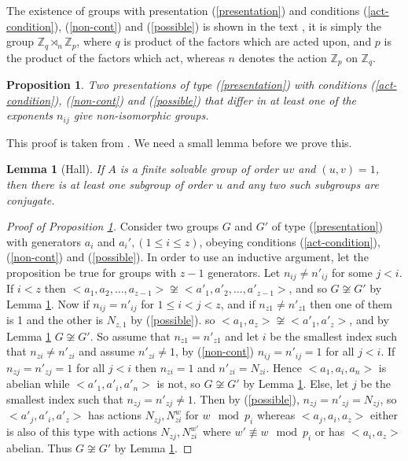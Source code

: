 \documentclass[a4paper, 10pt]{book}
\newtheorem{Lem}[theorem]{Lemma}
\newtheorem{Prop}[theorem]{Proposition}
\theoremstyle{definition}
\numberwithin{equation}{chapter}
\newcommand\ZZ{\mathbb Z}
\newcommand\semidir\rtimes
\begin{document}
The existence of groups with presentation (\ref{presentation}) and conditions (\ref{act-condition}), (\ref{non-cont}) and (\ref{possible}) is shown in the text \cite[Section 9.2.2]{MR896269}, it is simply the group $\ZZ_q\semidir_n \ZZ_p$, where $q$ is product of the factors which are acted upon, and $p$ is the product of the factors which act, whereas $n$ denotes the action $\ZZ_p$ on $\ZZ_q$.  \begin{Prop}\label{uniqueness}
Two presentations of type (\ref{presentation})  with conditions (\ref{act-condition}), (\ref{non-cont}) and (\ref{possible}) that differ in at least one of the exponents $n_{ij}$ give non-isomorphic groups.
\end{Prop}
This proof is taken from \cite{MR506898}. We need a small lemma before we prove this.
\begin{Lem}[Hall]\label{hall}
If $A$ is a finite solvable group of order $uv$ and $(u,v) = 1$, then there is at least one subgroup of order $u$ and any two such subgroups are conjugate.
\end{Lem}
\begin{proof}[Proof of Proposition \ref{uniqueness}]
Consider two groups $G$ and $G'$ of type (\ref{presentation}) with generators $a_i$ and $a_i', (1\leq i \leq z)$, obeying conditions (\ref{act-condition}), (\ref{non-cont}) and (\ref{possible}). 
In order to use an inductive argument, let the proposition be true for groups with $z-1$ generators. Let $n_{ij}\neq n'_{ij}$ for some $j< i$. 
If $i< z$ then $<a_1,a_2,\dots, a_{z-1}> \not\cong <a'_1,a'_2,\dots, a'_{z-1}>$, and so $G\not\cong G'$ by Lemma \ref{hall}. Now if $n_{ij} = n'_{ij}$ for $1\leq i<j<z$, and if $n_{z1}\neq n'_{z1}$ then one of them is 1 and the other is $N_{z,1}$ by (\ref{possible}). so $<a_1, a_z> \not \cong <a'_1, a'_z>$, and by Lemma \ref{hall} $G\not\cong G'$. So assume that $n_{z1} = n'_{z1}$ and let $i$ be the smallest index such that $n_{z i}\neq n'_{zi}$ and assume $n'_{z i}\neq 1$, by (\ref{non-cont}) $n_{ij} = n'_{ij}=1$ for all $j<i$. If $n_{z j} = n'_{zj} = 1$ for all $j<i$ then $n_{zi} = 1$ and $n'_{zi} = N_{zi}$. Hence $<a_1, a_i, a_n>$ is abelian while $<a'_1, a'_i, a'_n>$ is not, so $G\not\cong G'$ by Lemma \ref{hall}. Else, let $j$ be the smallest index such that $n_{zj} = n'_{zj} \neq 1$. Then by (\ref{possible}), $n_{zj} = n'_{zj} = N_{zj}$, so $<a'_j, a'_i, a'_z>$ has actions $N_{zj}, N_{zi}^w$ for $w \mod p_i$ whereas $<a_j, a_i, a_z>$ either is also of this type with actions $N_{zj}, N_{zi}^{w\prime}$ where $w'\not\equiv w \mod p_i$ or has $<a_i, a_z>$ abelian. Thus $G\not\cong G'$ by Lemma \ref{hall}. 
\end{proof}
\end{document}
